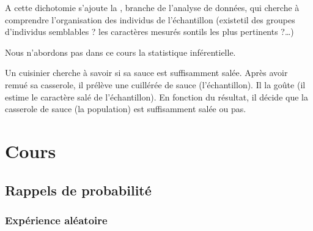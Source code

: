 \documentclass[letterpaper,10pt,english]{jupyterBook}
\begin{document}
\ignorespaces 
\sphinxAtStartPar
A cette dichotomie s’ajoute la , branche de l’analyse de données, qui cherche à comprendre l’organisation des individus de l’échantillon (existe\sphinxhyphen{}t\sphinxhyphen{}il des groupes d’individus semblables ? les caractères mesurés sont\sphinxhyphen{}ils les plus pertinents ?…)

\sphinxAtStartPar
Nous n’abordons pas dans ce cours la statistique inférentielle.

\sphinxAtStartPar
Un cuisinier cherche à savoir si sa sauce est suffisamment salée. Après avoir remué sa casserole, il prélève une cuillérée de sauce (l’échantillon). Il la goûte (il estime le caractère salé de l’échantillon). En fonction du résultat, il décide que la casserole de sauce (la population) est suffisamment salée ou pas.

\sphinxstepscope


\part{Cours}

\sphinxstepscope


\chapter{Rappels de probabilité}
\label{\detokenize{Rappels:rappels-de-probabilite}}\label{\detokenize{Rappels::doc}}

\section{Expérience aléatoire}
\label{\detokenize{Rappels:experience-aleatoire}}
\end{document}
